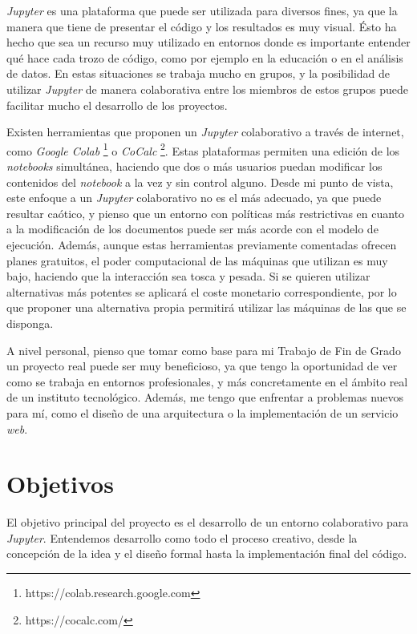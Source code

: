\documentclass[11pt,spanish,listoffigures]{tfgetsinf}
\begin{document}
\textit{Jupyter} es una plataforma que puede ser utilizada para diversos fines, ya que la manera que tiene de presentar el código y los resultados es muy visual. Ésto ha hecho que sea un recurso muy utilizado en entornos donde es importante entender qué hace cada trozo de código, como por ejemplo en la educación o en el análisis de datos. En estas situaciones se trabaja mucho en grupos, y la posibilidad de utilizar \textit{Jupyter} de manera colaborativa entre los miembros de estos grupos puede facilitar mucho el desarrollo de los proyectos.

Existen herramientas que proponen un \textit{Jupyter} colaborativo a través de internet, como \textit{Google Colab} \footnote{https://colab.research.google.com} o \textit{CoCalc} \footnote{https://cocalc.com/}. Estas plataformas permiten una edición de los \textit{notebooks} simultánea, haciendo que dos o más usuarios puedan modificar los contenidos del \textit{notebook} a la vez y sin control alguno. Desde mi punto de vista, este enfoque a un \textit{Jupyter} colaborativo no es el más adecuado, ya que puede resultar caótico, y pienso que un entorno con políticas más restrictivas en cuanto a la modificación de los documentos puede ser más acorde con el modelo de ejecución. Además, aunque estas herramientas previamente comentadas ofrecen planes gratuitos, el poder computacional de las máquinas que utilizan es muy bajo, haciendo que la interacción sea tosca y pesada. Si se quieren utilizar alternativas más potentes se aplicará el coste monetario correspondiente, por lo que proponer una alternativa propia permitirá utilizar las máquinas de las que se disponga.

A nivel personal, pienso que tomar como base para mi Trabajo de Fin de Grado un proyecto real puede ser muy beneficioso, ya que tengo la oportunidad de ver como se trabaja en entornos profesionales, y más concretamente en el ámbito real de un instituto tecnológico. Además, me tengo que enfrentar a problemas nuevos para mí, como el diseño de una arquitectura o la implementación de un servicio \textit{web}. 



\section{Objetivos}
\label{sec:objetivos}

El objetivo principal del proyecto es el desarrollo de un entorno colaborativo para \textit{Jupyter}. Entendemos desarrollo como todo el proceso creativo, desde la concepción de la idea y el diseño formal hasta la implementación final del código.
\end{document}
